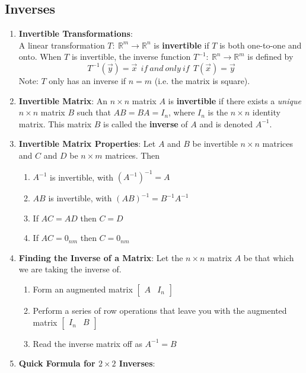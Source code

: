 \documentclass[10pt]{article}
\begin{document}
\subsection{Inverses}
\begin{enumerate}
\item \textbf{Invertible Transformations}: \\
A linear transformation $T:\ \mathbb{R}^m \rightarrow \mathbb{R}^n$ is \textbf{invertible} if $T$ is both one-to-one and onto. When $T$ is invertible, the inverse function $T^{-1}:\ \mathbb{R}^n \rightarrow \mathbb{R}^m$ is defined by
$$T^{-1}(\vec{y}) = \vec{x}\ \ if\ and\ only\ if\ \ T(\vec{x}) = \vec{y}$$
Note: $T$ only has an inverse if $n = m$ (i.e. the matrix is square).
\item \textbf{Invertible Matrix}: An $n \times n$ matrix $A$ is \textbf{invertible} if there exists a \textit{unique} $n \times n$ matrix $B$ such that $AB = BA = I_n$, where $I_n$ is the $n \times n$ identity matrix. This matrix $B$ is called the \textbf{inverse} of $A$ and is denoted $A^{-1}$.
\item \textbf{Invertible Matrix Properties}: Let $A$ and $B$ be invertible $n \times n$ matrices and $C$ and $D$ be $n \times m$ matrices. Then
\begin{enumerate}
\item $A^{-1}$ is invertible, with $(A^{-1})^{-1} = A$
\item $AB$ is invertible, with $(AB)^{-1} = B^{-1}A^{-1}$
\item If $AC = AD$ then $C = D$
\item If $AC = 0_{nm}$ then $C = 0_{nm}$
\end{enumerate}
\item \textbf{Finding the Inverse of a Matrix}: Let the $n \times n$ matrix $A$ be that which we are taking the inverse of.
\begin{enumerate}
\item Form an augmented matrix $\begin{bmatrix}
A & I_n
\end{bmatrix}$
\item Perform a series of row operations that leave you with the augmented matrix $\begin{bmatrix}
I_n & B
\end{bmatrix}$
\item Read the inverse matrix off as $A^{-1} = B$
\end{enumerate}
\item \textbf{Quick Formula for $2 \times 2$ Inverses}: \\

\end{enumerate}
\end{document}
